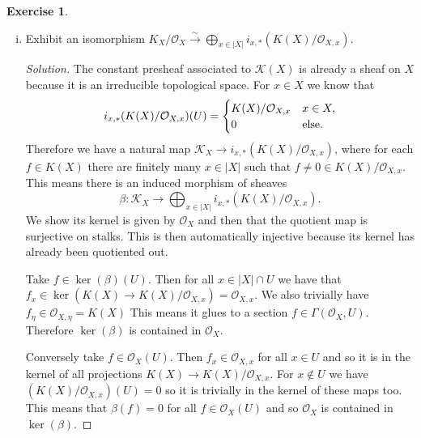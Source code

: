 \documentclass{article}
\renewcommand{\qedsymbol}{\raisebox{-0.5cm}{}}
\newcommand{\sheaf}{\mathcal{O}}
\newcommand{\isom}{\overset{\sim}{\longrightarrow}}
\newcommand{\ff}{\mathcal{K}}
\newenvironment{solution}{\begin{proof}[Solution]\renewcommand\qedsymbol{}}{\end{proof}}
\theoremstyle{definition}
\newtheorem{question}{Exercise}
\begin{document}
\begin{question}
\begin{enumerate}[(i), resume]
\begin{proof}
                  The map is componentwise a morphism so it is a morphism.
              \end{proof}

        \item Exhibit an isomorphism
              \(K_{X}/\sheaf_{X}\isom\bigoplus_{x\in|X|}i_{x,*}(K(X)/\sheaf_{X,x})\).

              \begin{solution}
                  The constant presheaf associated to \(\ff(X)\) is already a
                  sheaf on \(X\) because it is an irreducible topological space.
                  For \(x\in X\) we know that
                  \[
                      i_{x,*}(K(X)/\sheaf_{X,x})(U)=\begin{cases}
                          K(X)/\sheaf_{X,x} & x\in X,            \\
                          0                 & \textnormal{else}.
                      \end{cases}
                  \]
                  Therefore we have a natural map \(\ff_{X}\to
                  i_{x,*}(K(X)/\sheaf_{X,x})\), where for each \(f\in K(X)\)
                  there are finitely many \(x\in |X|\) such that \(f\neq 0\in
                  K(X)/\sheaf_{X,x}\). This means there is an induced morphism
                  of sheaves
                  \[
                      \beta:\ff_{X}\to\bigoplus_{x\in|X|}i_{x,*}(K(X)/\sheaf_{X,x}).
                  \]
                  We show its kernel is given by \(\sheaf_{X}\) and then that
                  the quotient map is surjective on stalks. This is then
                  automatically injective because its kernel has already been
                  quotiented out.

                  Take \(f\in\ker(\beta)(U)\). Then for all \(x\in |X|\cap U\)
                  we have that \(f_{x}\in \ker(K(X)\to
                  K(X)/\sheaf_{X,x})=\sheaf_{X,x}\). We also trivially have
                  \(f_{\eta}\in \sheaf_{X,\eta}=K(X)\) This means it glues to a
                  section \(f\in\Gamma(\sheaf_{X},U)\). Therefore
                  \(\ker(\beta)\) is contained in \(\sheaf_{X}\).

                  Conversely take \(f\in\sheaf_{X}(U)\). Then
                  \(f_{x}\in\sheaf_{X,x}\) for all \(x\in U\) and so it is in
                  the kernel of all projections \(K(X)\to K(X)/\sheaf_{X,x}\).
                  For \(x\notin U\) we have \((K(X)/\sheaf_{X,x})(U)=0\) so it
                  is trivially in the kernel of these maps too. This means that
                  \(\beta(f)=0\) for all \(f\in\sheaf_{X}(U)\) and so
                  \(\sheaf_{X}\) is contained in \(\ker(\beta)\).


\end{solution}
\end{enumerate}
\end{question}
\end{document}
